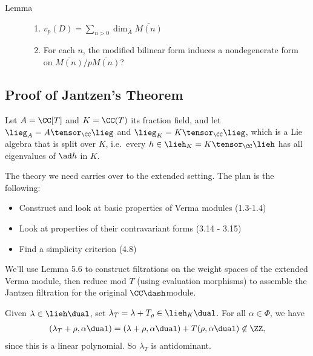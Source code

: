 \begin{description}
\item[Lemma]
\hfill

\begin{enumerate}
\def\labelenumi{\arabic{enumi}.}
\tightlist
\item
  \(v_p(D) = \sum_{n > 0} \dim_{\bar A} \bar{M(n)}\)
\item
  For each \(n\), the modified bilinear form induces a nondegenerate
  form on \(\bar{M(n)} / p\bar{M(n)}\)?
\end{enumerate}
\end{description}

\hypertarget{proof-of-jantzens-theorem}{%
\subsection{Proof of Jantzen's
Theorem}\label{proof-of-jantzens-theorem}}

Let \(A = \CC[T]\) and \(K = \CC(T)\) its fraction field, and let
\(\lieg_A = A \tensor_\CC \lieg\) and \(\lieg_K = K \tensor_\CC \lieg\),
which is a Lie algebra that is split over \(K\), i.e.~every
\(h\in \lieh_K = K \tensor_\CC \lieh\) has all eigenvalues of \(\ad h\)
in \(K\).

The theory we need carries over to the extended setting. The plan is the
following:

\begin{itemize}
\tightlist
\item
  Construct and look at basic properties of Verma modules (1.3-1.4)
\item
  Look at properties of their contravariant forms (3.14 - 3.15)
\item
  Find a simplicity criterion (4.8)
\end{itemize}

We'll use Lemma 5.6 to construct filtrations on the weight spaces of the
extended Verma module, then reduce mod \(T\) (using evaluation
morphisms) to assemble the Jantzen filtration for the original
\(\CC\dash\)module.

Given \(\lambda \in \lieh\dual\), set
\(\lambda_T = \lambda + T_\rho \in \lieh_K\dual\). For all
\(\alpha\in \Phi\), we have \begin{align*}
(\lambda_T  + \rho, \alpha\dual) =
(\lambda + \rho , \alpha\dual) + T(\rho, \alpha\dual) \not\in \ZZ
,\end{align*} since this is a linear polynomial. So \(\lambda_T\) is
antidominant.

